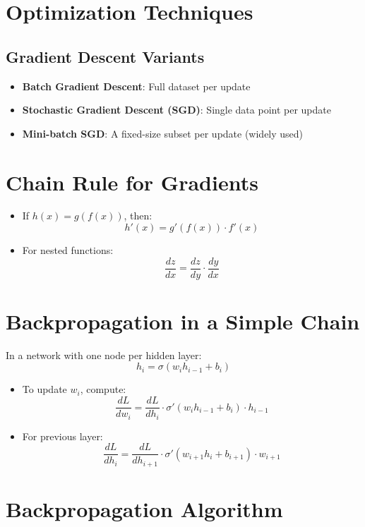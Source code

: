 \documentclass[11pt]{article}
\begin{document}
\section{Optimization Techniques}

\subsection*{Gradient Descent Variants}

\begin{itemize}
    \item \textbf{Batch Gradient Descent}: Full dataset per update
    \item \textbf{Stochastic Gradient Descent (SGD)}: Single data point per update
    \item \textbf{Mini-batch SGD}: A fixed-size subset per update (widely used)
\end{itemize}

\section{Chain Rule for Gradients}

\begin{itemize}
    \item If $h(x) = g(f(x))$, then:
    \[
    h'(x) = g'(f(x)) \cdot f'(x)
    \]
    \item For nested functions:
    \[
    \frac{dz}{dx} = \frac{dz}{dy} \cdot \frac{dy}{dx}
    \]
\end{itemize}

\section{Backpropagation in a Simple Chain}

In a network with one node per hidden layer:
\[
h_i = \sigma(w_i h_{i-1} + b_i)
\]

\begin{itemize}
    \item To update $w_i$, compute:
    \[
    \frac{dL}{dw_i} = \frac{dL}{dh_i} \cdot \sigma'(w_i h_{i-1} + b_i) \cdot h_{i-1}
    \]

    \item For previous layer:
    \[
    \frac{dL}{dh_i} = \frac{dL}{dh_{i+1}} \cdot \sigma'(w_{i+1} h_i + b_{i+1}) \cdot w_{i+1}
    \]
\end{itemize}

\section{Backpropagation Algorithm}
\end{document}

